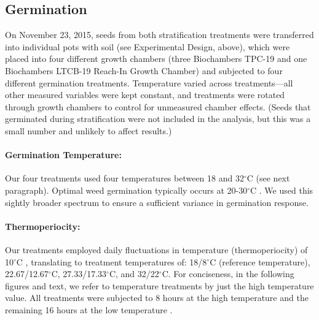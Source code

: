 \documentclass[11pt]{article}\usepackage[]{graphicx}\usepackage[]{color}
\begin{document}
	\subsection{Germination}
	On November 23, 2015, seeds from both stratification treatments were transferred into individual pots with soil (see Experimental Design, above), which were placed into four different growth chambers (three Biochambers TPC-19 and one Biochambers LTCB-19 Reach-In Growth Chamber) and subjected to four different germination treatments. Temperature varied across treatments---all other measured variables were kept constant, and treatments were rotated through growth chambers to control for unmeasured chamber effects. (Seeds that germinated during stratification were not included in the analysis, but this was a small number and unlikely to affect results.)
	
	\paragraph{Germination Temperature:} Our four treatments used four temperatures between 18 and 32$^\circ$C (see next paragraph). Optimal weed germination typically occurs at 20-30$^\circ$C \parencite{Hartmann2010,Steinbauer1957,Wulff1994,Popay1970}. We used this sightly broader spectrum to ensure a sufficient variance in germination response.
	
	\paragraph{Thermoperiocity:} Our treatments employed daily fluctuations in temperature (thermoperiocity) of 10$^\circ$C \parencite[see e.g.,][]{Steinbauer1957, Toole1963,ISTA1954}, translating to treatment temperatures of: 18/8$^\circ$C (reference temperature), 22.67/12.67$^\circ$C, 27.33/17.33$^\circ$C, and 32/22$^\circ$C. For conciseness, in the following figures and text, we refer to temperature treatments by just the high temperature value. All treatments were subjected to 8 hours at the high temperature and the remaining 16 hours at the low temperature \parencite{Baskin1998,Roberts1981,Popay1970,Probert2000}. %
\end{document}
